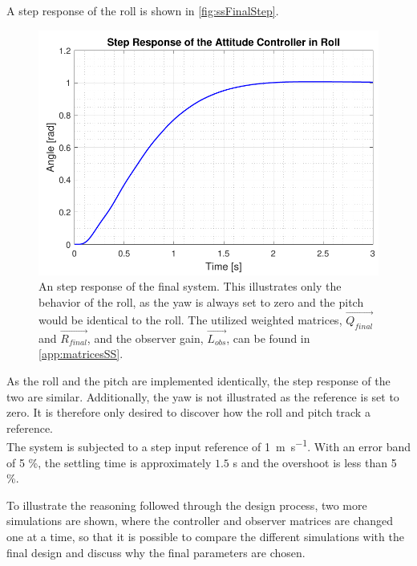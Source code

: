 A step response of the roll is shown in \autoref{fig:ssFinalStep}.
\begin{figure}[H]
	\centering
	\includegraphics[scale=0.59]{figures/ssFinalStep.pdf}
	\caption{An step response of the final system. This illustrates only the behavior of the roll, as the yaw is always set to zero and the pitch would be identical to the roll. The utilized weighted matrices, $\vec{Q_{final}}$ and $\vec{R_{final}}$, and the observer gain, $\vec{L_{obs}}$, can be found in \autoref{app:matricesSS}.}
	\label{fig:ssFinalStep}
\end{figure}
As the roll and the pitch are implemented identically, the step response of the two are similar. Additionally, the yaw is not illustrated as the reference is set to zero. It is therefore only desired to discover how the roll and pitch track a reference. \\
The system is subjected to a step input reference of \SI{1}{m s^{-1}}. With an error band of 5 \%, the settling time is approximately $1.5$ s and the overshoot is less than 5 \%.

To illustrate the reasoning followed through the design process, two more simulations are shown, where the controller and observer matrices are changed one at a time, so that it is possible to compare the different simulations with the final design and discuss why the final parameters are chosen.

